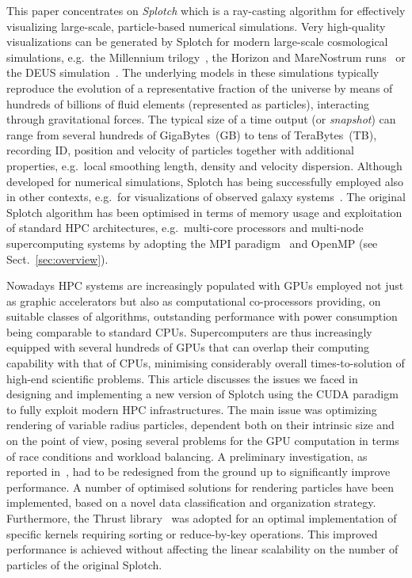 \documentclass[smallextended]{svjour3}
\begin{document}
This paper concentrates on {\it Splotch} \cite{2008NJPh...10l5006D} which is a ray-casting algorithm for effectively visualizing large-scale, particle-based numerical simulations. Very high-quality visualizations can be generated by Splotch for modern large-scale cosmological simulations, e.g.\ the Millennium trilogy~\cite{millennium}, the Horizon and MareNostrum runs~\cite{horizon} or the DEUS simulation~\cite{deus}. The underlying models in these simulations typically reproduce the evolution of a representative fraction of the universe by means of hundreds of billions of fluid elements (represented as particles), interacting through gravitational forces. The typical size of a time output (or {\it snapshot}) can range from several hundreds of GigaBytes~(GB) to tens of TeraBytes~(TB), recording ID, position and velocity of particles together with additional properties, e.g.\ local smoothing length, density and velocity dispersion. Although developed for numerical simulations, Splotch has being successfully employed also in other contexts, e.g.\ for visualizations of observed galaxy systems~\cite{m83-vis}.
The original Splotch algorithm has been optimised in terms of memory usage and exploitation of standard HPC architectures, e.g.\ multi-core processors and multi-node supercomputing systems by adopting the MPI paradigm~\cite{jin:high-performance} and OpenMP (see Sect.~\ref{sec:overview}).

Nowadays HPC systems are increasingly populated with GPUs employed not just as graphic accelerators but also as computational co-processors providing, on suitable classes of algorithms, outstanding performance with power consumption being comparable to standard CPUs. Supercomputers are thus increasingly equipped with several hundreds of GPUs that can overlap their computing capability with that of CPUs, minimising considerably overall times-to-solution of high-end scientific problems. This article discusses the issues we faced in designing and implementing a new version of Splotch using the CUDA paradigm~\cite{cudaurl} to fully exploit modern HPC infrastructures. The main issue was optimizing rendering of variable radius particles, dependent both on their intrinsic size and on the point of view, posing several problems for the GPU computation in terms of race conditions and workload balancing. A preliminary investigation, as reported in~\cite{jin:high-performance}, had to be redesigned from the ground up to significantly improve performance. A number of optimised solutions for rendering particles have been implemented, based on a novel data classification and organization strategy. Furthermore, the Thrust library~\cite{thrusturl} was adopted for an optimal implementation of specific kernels requiring sorting or reduce-by-key operations.
This improved performance is achieved without affecting the linear scalability on the number of particles of the original Splotch. 
\end{document}
